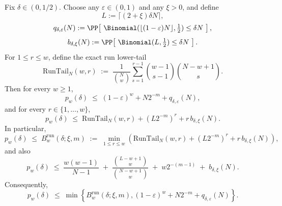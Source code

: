 \begin{corollary}
\label{cor:dense-inner-piecewise}
Fix $\delta\in(0,1/2)$.
Choose any $\varepsilon\in(0,1)$ and any $\xi>0$, and define
\[
L:=\lceil(2+\xi)\delta N\rceil,
\]
\[
q_{\delta,\varepsilon}(N)
:=
\PP\!\left[\ \Binomial(\lfloor(1-\varepsilon)N\rfloor,\tfrac12)\le \delta N\ \right],
\]
\[
b_{\delta,\xi}(N)
:=
\PP\!\left[\ \Binomial(L,\tfrac12)\le \delta N\ \right].
\]
For $1\le r\le w$, define the exact run lower-tail
\[
\mathrm{RunTail}_N(w,r)
\;:=\;
\frac{1}{\binom{N}{w}}
\sum_{s=1}^{r-1}
\binom{w-1}{s-1}\binom{N-w+1}{s}.
\]
Then for every $w\ge 1$,
\begin{equation}
\label{eq:dense-inner-global-envelope}
p_w(\delta)
\;\le\;
(1-\varepsilon)^w + N2^{-m} + q_{\delta,\varepsilon}(N),
\end{equation}
and for every $r\in\{1,\dots,w\}$,
\begin{equation}
\label{eq:dense-inner-run-envelope}
p_w(\delta)
\;\le\;
\mathrm{RunTail}_N(w,r) + (L2^{-m})^r + r\,b_{\delta,\xi}(N).
\end{equation}
In particular,
\begin{equation}
\label{eq:dense-inner-run-opt-envelope}
p_w(\delta)
\;\le\;
B_w^{\mathrm{run}}(\delta;\xi,m)
\;:=\;
\min_{1\le r\le w}
\left(
\mathrm{RunTail}_N(w,r) + (L2^{-m})^r + r\,b_{\delta,\xi}(N)
\right),
\end{equation}
and also
\begin{equation}
\label{eq:dense-inner-smallw-envelope}
p_w(\delta)
\;\le\;
\frac{w(w-1)}{N-1}
\;+\;
\frac{\binom{L-w+1}{w}}{\binom{N-w+1}{w}}
\;+\;
w2^{-(m-1)}
\;+\;
b_{\delta,\xi}(N).
\end{equation}
Consequently,
\begin{equation}
\label{eq:dense-inner-best-envelope}
p_w(\delta)
\;\le\;
\min\!\left\{
B_w^{\mathrm{run}}(\delta;\xi,m),
(1-\varepsilon)^w + N2^{-m} + q_{\delta,\varepsilon}(N)
\right\}.
\end{equation}
\end{corollary}

